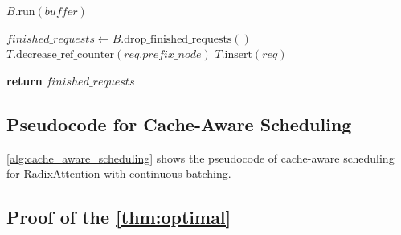 \begin{algorithm}[t]
\begin{algorithmic}
\State $B.\text{run}(buffer)$

\State {}
\State $finished\_requests \leftarrow B.\text{drop\_finished\_requests}()$
    \State $T.\text{decrease\_ref\_counter}(req.prefix\_node)$
    \State $T.\text{insert}(req)$
\EndFor

\State \textbf{return} $finished\_requests$
\end{algorithmic}
\end{algorithm}


\subsection{Pseudocode for Cache-Aware Scheduling}
\label{subsec:pseudocode_cache_aware_scheduling}

\autoref{alg:cache_aware_scheduling} shows the pseudocode of cache-aware scheduling for RadixAttention with continuous batching.


\subsection{Proof of the \autoref{thm:optimal} }
\label{subsec:schedule_proof}

